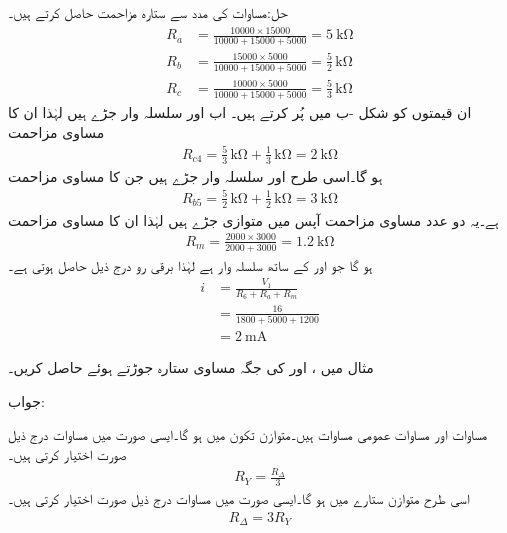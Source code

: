 حل:مساوات  کی مدد سے ستارہ مزاحمت حاصل کرتے ہیں۔
\begin{align*}
R_a&=\frac{10000 \times 15000 }{10000+15000+5000}=\SI{5}{\kilo\ohm}\\
R_b&=\frac{15000\times 5000}{10000+15000+5000}=\frac{5}{2} \, \si{\kilo\ohm}\\
R_c&=\frac{10000\times 5000}{10000+15000+5000}=\frac{5}{3} \, \si{\kilo\ohm}
\end{align*}
ان قیمتوں کو شکل -ب میں پُر کرتے ہیں۔ اب  اور  سلسلہ وار جڑے ہیں لہٰذا ان کا مساوی مزاحمت
\begin{align*}
R_{c4}=\frac{5}{3} \, \si{\kilo\ohm}+\frac{1}{3}\, \si{\kilo\ohm}=\SI{2}{\kilo\ohm}
\end{align*}
ہو گا۔اسی طرح  اور  سلسلہ وار جڑے ہیں جن کا مساوی مزاحمت 
\begin{align*}
R_{b5}=\frac{5}{2} \, \si{\kilo\ohm}+\frac{1}{2} \, \si{\kilo\ohm}=\SI{3}{\kilo\ohm}
\end{align*}
ہے۔یہ دو عدد مساوی مزاحمت آپس میں متوازی جڑے ہیں لہٰذا ان کا مساوی مزاحمت
\begin{align*}
R_m=\frac{2000 \times 3000}{2000+3000}=\SI{1.2}{\kilo\ohm}
\end{align*}
ہو گا جو  اور  کے ساتھ سلسلہ وار ہے لہٰذا برقی رو درج ذیل حاصل ہوتی ہے۔
\begin{align*}
i&=\frac{V_1}{R_6+R_a+R_m}\\
&=\frac{16}{1800+5000+1200}\\
&=\SI{2}{\milli\ampere}
\end{align*}

مثال   میں ،  اور   کی جگہ مساوی ستارہ جوڑتے ہوئے   حاصل کریں۔

جواب:

مساوات  اور مساوات  عمومی مساوات ہیں۔متوازن تکون  میں  ہو گا۔ایسی صورت میں مساوات  درج ذیل صورت اختیار کرتی ہیں۔
\begin{align}\label{مساوات_مزاحمتی_متوازن_تکون_سے_ستارہ}
R_Y=\frac{R_{\Delta}}{3}
\end{align}
اسی طرح متوازن ستارے میں  ہو گا۔ایسی صورت میں مساوات  درج ذیل صورت اختیار کرتی ہیں۔
\begin{align}\label{مساوات_مزاحمتی_متوازن_ستارہ_سے_تکون}
R_{\Delta}=3 R_Y
\end{align}

